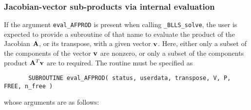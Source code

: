 \documentclass{galahad}
\newcommand{\packagename}{BLLS}
\newcommand{\fullpackagename}{\libraryname\_\packagename}
\newcommand{\solver}{{\tt \fullpackagename\_solve}}
\begin{document}

\subsubsection{Jacobian-vector sub-products via internal evaluation\label{jvsp}}

If the argument {\tt eval\_AFPROD} is present when calling \solver, the
user is expected to provide a subroutine of that name to evaluate the
product of the Jacobian ${\mathbf{A}}$, or its transpose, with a given vector ${\mathbf{v}}$.
Here, either only a subset of the components of the vector ${\mathbf{v}}$ are nonzero,
or only a subset of the components product ${\mathbf{A}}^T {\mathbf{v}}$ are to required.
The routine must be specified as

\def\baselinestretch{0.8}
{\tt \begin{verbatim}
       SUBROUTINE eval_AFPROD( status, userdata, transpose, V, P, FREE, n_free )
\end{verbatim} }
\def\baselinestretch{1.0}
\noindent whose arguments are as follows:
\end{document}
